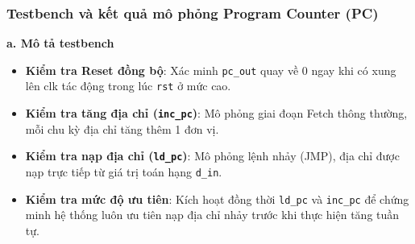 \subsubsection{Testbench và kết quả mô phỏng Program Counter (PC)}

\textbf{a. Mô tả testbench} \\
\begin{itemize}
    \item \textbf{Kiểm tra Reset đồng bộ}: Xác minh \texttt{pc\_out} quay về 0 ngay khi có xung lên clk tác động trong lúc \texttt{rst} ở mức cao.
    \item \textbf{Kiểm tra tăng địa chỉ (\texttt{inc\_pc})}: Mô phỏng giai đoạn Fetch thông thường, mỗi chu kỳ địa chỉ tăng thêm 1 đơn vị.
    \item \textbf{Kiểm tra nạp địa chỉ (\texttt{ld\_pc})}: Mô phỏng lệnh nhảy (JMP), địa chỉ được nạp trực tiếp từ giá trị toán hạng \texttt{d\_in}.
    \item \textbf{Kiểm tra mức độ ưu tiên}: Kích hoạt đồng thời \texttt{ld\_pc} và \texttt{inc\_pc} để chứng minh hệ thống luôn ưu tiên nạp địa chỉ nhảy trước khi thực hiện tăng tuần tự.
\end{itemize}


